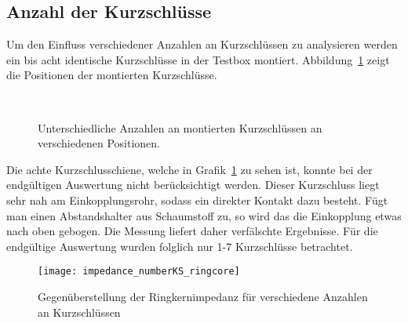 \subsection{Anzahl der Kurzschl\"usse}
Um den Einfluss verschiedener Anzahlen an Kurzschl\"ussen zu analysieren werden ein bis acht identische Kurzschl\"usse in der Testbox montiert. Abbildung~\ref{fig:ringcorenumberCST} zeigt die Positionen der montierten Kurzschl\"usse.
\begin{figure}[htb]
	\centering
	\hspace{0.0065\textwidth}
	\hspace{0.0065\textwidth}
	\hspace{0.0065\textwidth}
	\\
	\hspace{0.0065\textwidth}
	\hspace{0.0065\textwidth}
	\hspace{0.0065\textwidth}
	\caption{Unterschiedliche Anzahlen an montierten Kurzschl\"ussen an verschiedenen Positionen.}
	\label{fig:ringcorenumberCST}
\end{figure}
\par
Die achte Kurzschlusschiene, welche in Grafik~\ref{fig:ringcorenumberCST} zu sehen ist, konnte bei der endg\"ultigen Auswertung nicht ber\"ucksichtigt werden. Dieser Kurzschluss liegt sehr nah am Einkopplungsrohr, sodass ein direkter Kontakt dazu besteht. F\"ugt man einen Abstandshalter aus Schaumstoff zu, so wird das die Einkopplung etwas nach oben gebogen. Die Messung liefert daher verf\"alschte Ergebnisse. F\"ur die endg\"ultige Auswertung wurden folglich nur 1-7 Kurzschl\"usse betrachtet.
\begin{figure}[htb]
	\centering
	\texttt{[image: impedance\_numberKS\_ringcore]}
	\caption{Gegen\"uberstellung der Ringkernimpedanz f\"ur verschiedene Anzahlen an Kurzschl\"ussen}
	\label{fig:ringcorenumber}
\end{figure}
\par
